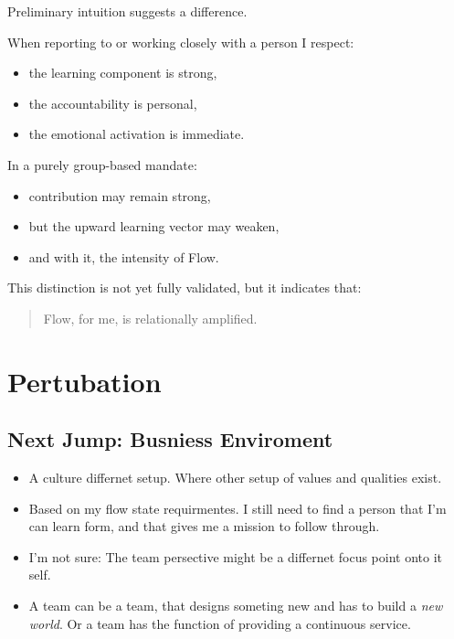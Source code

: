  Preliminary intuition suggests a difference.
 
 When reporting to or working closely with a person I respect:
 \begin{itemize}
 	\item the learning component is strong,
 	\item the accountability is personal,
 	\item the emotional activation is immediate.
 \end{itemize}
 
 In a purely group-based mandate:
 \begin{itemize}
 	\item contribution may remain strong,
 	\item but the upward learning vector may weaken,
 	\item and with it, the intensity of Flow.
 \end{itemize}
 
 This distinction is not yet fully validated, but it indicates that:
 
 \begin{quote}
 	Flow, for me, is relationally amplified.
 \end{quote}
 
 
 \section{Pertubation}
 
 \subsection{Next Jump: Busniess Enviroment}
 
 \begin{itemize}
 	\item A culture differnet setup. Where other setup of values and qualities exist.
 	\item Based on my flow state requirmentes. I still need to find a person that I'm can learn form, and that gives me a mission to follow through.
 	\item I'm not sure: The team persective might be a differnet focus point onto it self.
 	\item A team can be a team, that designs someting new and has to build a \textit{new world}.  Or a team has the function of providing a continuous service.
 \end{itemize}
 

